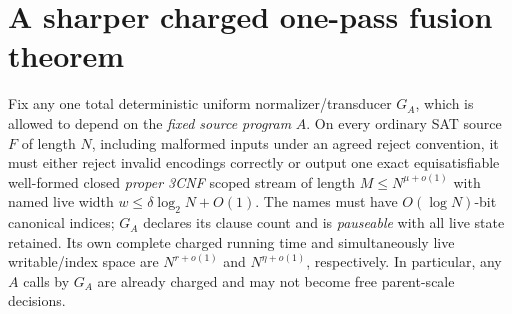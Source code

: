 \documentclass[11pt]{article}
\begin{document}
\section{A sharper charged one-pass fusion theorem}
Fix any one total deterministic uniform normalizer/transducer $G_A$,
which is allowed to depend on the \emph{fixed source program} $A$.
On every ordinary SAT source $F$ of length $N$, including malformed
inputs under an agreed reject convention, it must either reject
invalid encodings correctly or output one exact equisatisfiable
well-formed closed \emph{proper 3CNF} scoped stream of length
$M\le N^{\mu+o(1)}$ with named live width
$w\le\delta\log_2 N+O(1)$.  The names must have
$O(\log N)$-bit canonical indices; $G_A$ declares its clause count
and is \emph{pauseable} with all live state retained.  Its own complete
charged running time and simultaneously live writable/index space are
$N^{r+o(1)}$ and $N^{\eta+o(1)}$, respectively.
In particular, any $A$ calls by $G_A$ are already charged and
may not become free parent-scale decisions.
\end{document}
